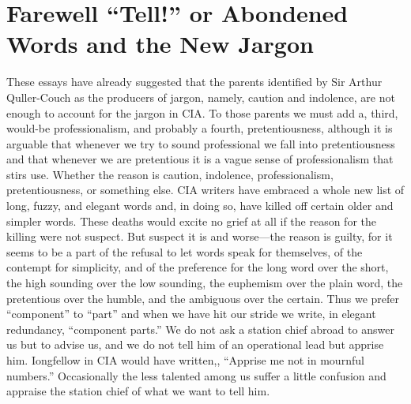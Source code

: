 \documentclass[
    oneside,
    11pt,
    draft
]{memoir}
\begin{document}
\chapter{Farewell \enquote{Tell!} or Abondened Words and the New Jargon}

These essays have already suggested that the parents identified by Sir Arthur Quller-Couch as the producers of jargon, namely, caution and indolence, are not enough to account for the jargon in CIA. To those parents we must add a, third,  would-be professionalism, and probably a fourth, pretentiousness, although it is arguable that whenever we try to sound professional we fall into pretentiousness and that whenever we are pretentious it is a vague sense of professionalism that stirs use. Whether the reason is caution, indolence, professionalism, pretentiousness, or something else. CIA writers have embraced a whole new list of long, fuzzy, and elegant words and, in doing so, have killed off certain older and simpler words. These deaths would excite no grief at all if the reason for the killing were not suspect. But suspect it is and worse---the reason is guilty, for it seems to be a part of the refusal to let words speak for themselves, of the contempt for simplicity, and of the preference for the long word over the short, the high sounding over the low sounding, the euphemism over the plain word, the pretentious over the humble, and the ambiguous over the certain. Thus we prefer \enquote{component} to \enquote{part} and when we have hit our stride we write, in elegant redundancy, \enquote{component parts.} We do not ask a station chief abroad to answer us but to advise us, and we do not tell him of an operational lead but apprise him. Iongfellow in CIA would have written,, \enquote{Apprise me not in mournful numbers.} Occasionally the less talented among us suffer a little confusion and appraise the station chief of what we want to tell him.
\end{document}
